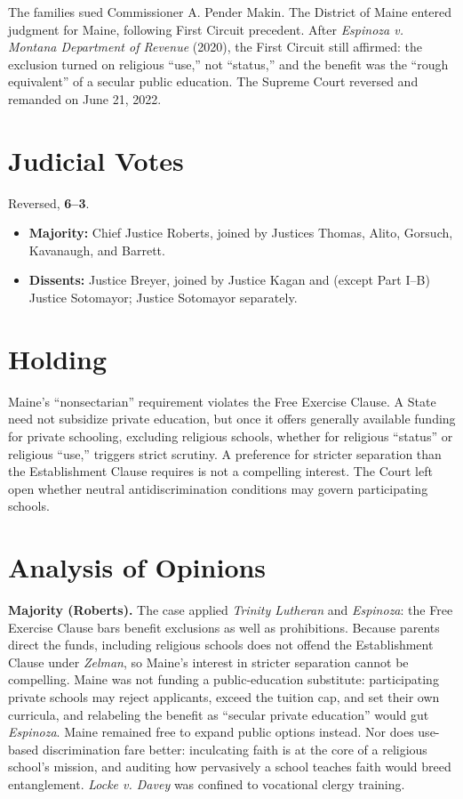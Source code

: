 \documentclass[12pt]{article}
\begin{document}
The families sued Commissioner A. Pender Makin. The District of Maine entered judgment for Maine, following First Circuit precedent. After \textit{Espinoza v. Montana Department of Revenue} (2020), the First Circuit still affirmed: the exclusion turned on religious ``use,'' not ``status,'' and the benefit was the ``rough equivalent'' of a secular public education. The Supreme Court reversed and remanded on June 21, 2022.

\section{Judicial Votes}

Reversed, \textbf{6--3}.
\begin{itemize}
\item \textbf{Majority:} Chief Justice Roberts, joined by Justices Thomas, Alito, Gorsuch, Kavanaugh, and Barrett.
\item \textbf{Dissents:} Justice Breyer, joined by Justice Kagan and (except Part I--B) Justice Sotomayor; Justice Sotomayor separately.
\end{itemize}

\section{Holding}

Maine's ``nonsectarian'' requirement violates the Free Exercise Clause. A State need not subsidize private education, but once it offers generally available funding for private schooling, excluding religious schools, whether for religious ``status'' or religious ``use,'' triggers strict scrutiny. A preference for stricter separation than the Establishment Clause requires is not a compelling interest. The Court left open whether neutral antidiscrimination conditions may govern participating schools.

\section{Analysis of Opinions}

\textbf{Majority (Roberts).} The case applied \textit{Trinity Lutheran} and \textit{Espinoza}: the Free Exercise Clause bars benefit exclusions as well as prohibitions. Because parents direct the funds, including religious schools does not offend the Establishment Clause under \textit{Zelman}, so Maine's interest in stricter separation cannot be compelling. Maine was not funding a public-education substitute: participating private schools may reject applicants, exceed the tuition cap, and set their own curricula, and relabeling the benefit as ``secular private education'' would gut \textit{Espinoza}. Maine remained free to expand public options instead. Nor does use-based discrimination fare better: inculcating faith is at the core of a religious school's mission, and auditing how pervasively a school teaches faith would breed entanglement. \textit{Locke v. Davey} was confined to vocational clergy training.
\end{document}
